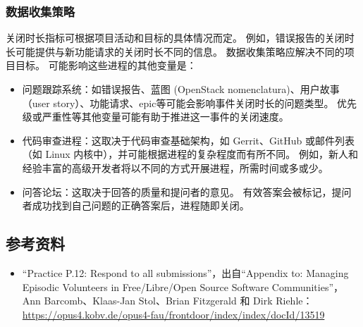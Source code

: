 \hypertarget{ux6570ux636eux6536ux96c6ux7b56ux7565}{%
\subsubsection{数据收集策略}\label{ux6570ux636eux6536ux96c6ux7b56ux7565}}

关闭时长指标可根据项目活动和目标的具体情况而定。
例如，错误报告的关闭时长可能提供与新功能请求的关闭时长不同的信息。
数据收集策略应解决不同的项目目标。 可能影响这些进程的其他变量是：

\begin{itemize}
\tightlist
\item
  问题跟踪系统：如错误报告、蓝图 (OpenStack
  nomenclatura)、用户故事（user
  story）、功能请求、epic等可能会影响事件关闭时长的问题类型。
  优先级或严重性等其他变量可能有助于推进这一事件的关闭速度。
\item
  代码审查进程：这取决于代码审查基础架构，如 Gerrit、GitHub
  或邮件列表（如 Linux 内核中），并可能根据进程的复杂程度而有所不同。
  例如，新人和经验丰富的高级开发者将以不同的方式开展进程，所需时间或多或少。
\item
  问答论坛：这取决于回答的质量和提问者的意见。
  有效答案会被标记，提问者成功找到自己问题的正确答案后，进程随即关闭。
\end{itemize}

\hypertarget{ux53c2ux8003ux8d44ux6599}{%
\subsection{参考资料}\label{ux53c2ux8003ux8d44ux6599}}

\begin{itemize}
\tightlist
\item
  ``Practice P.12: Respond to all submissions''，出自``Appendix to:
  Managing Episodic Volunteers in Free/Libre/Open Source Software
  Communities''，Ann Barcomb、Klaas-Jan Stol、Brian Fitzgerald 和 Dirk
  Riehle：\url{https://opus4.kobv.de/opus4-fau/frontdoor/index/index/docId/13519}
\end{itemize}
